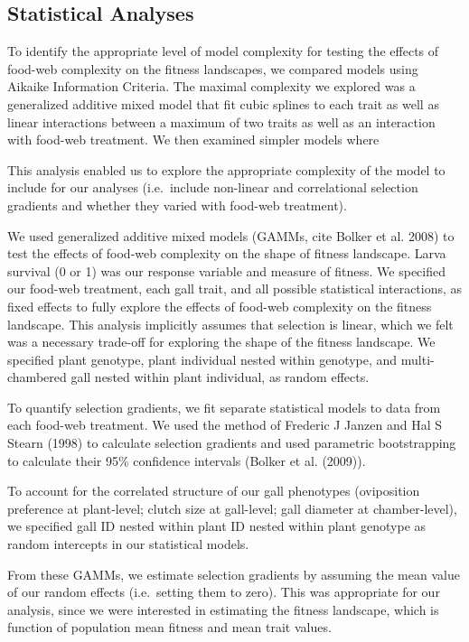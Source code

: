 \documentclass[]{elsarticle} %
\begin{document}
\subsection{Statistical Analyses}\label{statistical-analyses}

To identify the appropriate level of model complexity for testing the
effects of food-web complexity on the fitness landscapes, we compared
models using Aikaike Information Criteria. The maximal complexity we
explored was a generalized additive mixed model that fit cubic splines
to each trait as well as linear interactions between a maximum of two
traits as well as an interaction with food-web treatment. We then
examined simpler models where

This analysis enabled us to explore the appropriate complexity of the
model to include for our analyses (i.e.~include non-linear and
correlational selection gradients and whether they varied with food-web
treatment).

We used generalized additive mixed models (GAMMs, cite Bolker et al.
2008) to test the effects of food-web complexity on the shape of fitness
landscape. Larva survival (0 or 1) was our response variable and measure
of fitness. We specified our food-web treatment, each gall trait, and
all possible statistical interactions, as fixed effects to fully explore
the effects of food-web complexity on the fitness landscape. This
analysis implicitly assumes that selection is linear, which we felt was
a necessary trade-off for exploring the shape of the fitness landscape.
We specified plant genotype, plant individual nested within genotype,
and multi-chambered gall nested within plant individual, as random
effects.

To quantify selection gradients, we fit separate statistical models to
data from each food-web treatment. We used the method of Frederic J
Janzen and Hal S Stearn (1998) to calculate selection gradients and used
parametric bootstrapping to calculate their 95\% confidence intervals
(Bolker et al. (2009)).

To account for the correlated structure of our gall phenotypes
(oviposition preference at plant-level; clutch size at gall-level; gall
diameter at chamber-level), we specified gall ID nested within plant ID
nested within plant genotype as random intercepts in our statistical
models.

From these GAMMs, we estimate selection gradients by assuming the mean
value of our random effects (i.e.~setting them to zero). This was
appropriate for our analysis, since we were interested in estimating the
fitness landscape, which is function of population mean fitness and mean
trait values.
\end{document}
